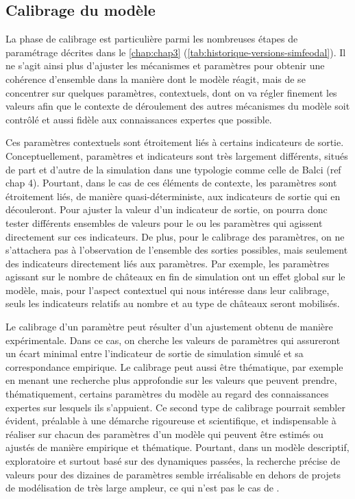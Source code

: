 \subsection{Calibrage du modèle \label{subsec:calibrage}}

La phase de calibrage est particulière parmi les nombreuses étapes de paramétrage décrites dans le \cref{chap:chap3} (\cref{tab:historique-versions-simfeodal}).
Il  ne s'agit ainsi plus d'ajuster les mécanismes et paramètres pour obtenir une cohérence d'ensemble dans la manière dont le modèle réagit, mais de se concentrer sur quelques paramètres, contextuels, dont on va régler finement les valeurs afin que le contexte de déroulement des autres mécanismes du modèle soit contrôlé et aussi fidèle aux connaissances expertes que possible.

Ces paramètres contextuels sont étroitement liés à certains indicateurs de sortie.
Conceptuellement, paramètres et indicateurs sont très largement différents, situés de part et d'autre de la simulation dans une typologie comme celle de Balci (ref chap 4).
Pourtant, dans le cas de ces éléments de contexte, les paramètres sont étroitement liés, de manière quasi-déterministe, aux indicateurs de sortie qui en découleront.
Pour \og ajuster\fg{} la valeur d'un indicateur de sortie, on pourra donc tester différents ensembles de valeurs pour le ou les paramètres qui agissent directement sur ces indicateurs.
De plus, pour le calibrage des paramètres, on ne s'attachera pas à l'observation de l'ensemble des sorties possibles, mais seulement des indicateurs directement liés aux paramètres.
Par exemple, les paramètres agissant sur le nombre de châteaux en fin de simulation ont un effet global sur le modèle, mais, pour l'aspect contextuel qui nous intéresse dans leur calibrage, seuls les indicateurs relatifs au nombre et au type de châteaux seront mobilisés.

Le calibrage d'un paramètre peut résulter d'un ajustement obtenu de manière expérimentale.
Dans ce cas, on cherche les valeurs de paramètres qui assureront un écart minimal entre l'indicateur de sortie de simulation simulé et sa correspondance empirique.
Le calibrage peut aussi être thématique, par exemple en menant une recherche plus approfondie sur les valeurs que peuvent prendre, thématiquement, certains paramètres du modèle au regard des connaissances expertes sur lesquels ils s'appuient.
Ce second type de calibrage pourrait sembler évident, préalable à une démarche rigoureuse et scientifique, et indispensable à réaliser sur chacun des paramètres d'un modèle qui peuvent être estimés ou ajustés de manière empirique et thématique.
Pourtant, dans un modèle descriptif, exploratoire et surtout basé sur des dynamiques passées, la recherche précise de valeurs pour des dizaines de paramètres semble irréalisable en dehors de projets de modélisation de très large ampleur, ce qui n'est pas le cas de \simfeodal{}.


